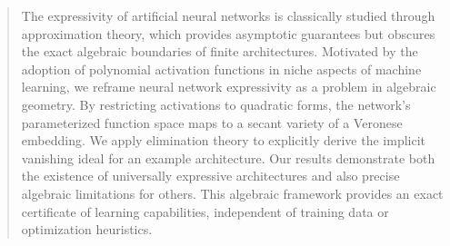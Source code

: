 \begin{abstract}
The expressivity of artificial neural networks is classically studied through approximation theory, which provides asymptotic guarantees but obscures the exact algebraic boundaries of finite architectures. Motivated by the adoption of polynomial activation functions in niche aspects of machine learning, we reframe neural network expressivity as a problem in algebraic geometry. By restricting activations to quadratic forms, the network's parameterized function space maps to a secant variety of a Veronese embedding. We apply elimination theory to explicitly derive the implicit vanishing ideal for an example architecture. Our results demonstrate both the existence of universally expressive architectures and also precise algebraic limitations for others. This algebraic framework provides an exact certificate of learning capabilities, independent of training data or optimization heuristics.
\end{abstract}
